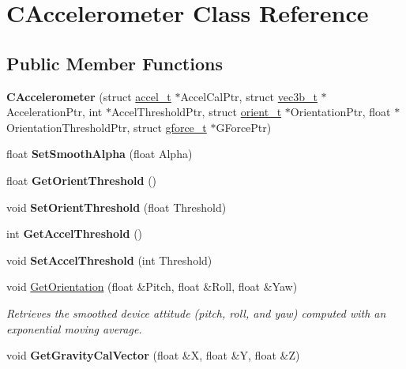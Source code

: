 \hypertarget{class_c_accelerometer}{\section{C\-Accelerometer Class Reference}
\label{class_c_accelerometer}
}
\subsection*{Public Member Functions}
\begin{DoxyCompactItemize}
\item 
\hypertarget{class_c_accelerometer_ac6a043c178545a10a47134638ab243df}{{\bfseries C\-Accelerometer} (struct \hyperlink{structaccel__t}{accel\-\_\-t} $\ast$Accel\-Cal\-Ptr, struct \hyperlink{structvec3b__t}{vec3b\-\_\-t} $\ast$Acceleration\-Ptr, int $\ast$Accel\-Threshold\-Ptr, struct \hyperlink{structorient__t}{orient\-\_\-t} $\ast$Orientation\-Ptr, float $\ast$Orientation\-Threshold\-Ptr, struct \hyperlink{structgforce__t}{gforce\-\_\-t} $\ast$G\-Force\-Ptr)}\label{class_c_accelerometer_ac6a043c178545a10a47134638ab243df}

\item 
\hypertarget{class_c_accelerometer_a09ce4dcabd897c0231569ebc9f476e6b}{float {\bfseries Set\-Smooth\-Alpha} (float Alpha)}\label{class_c_accelerometer_a09ce4dcabd897c0231569ebc9f476e6b}

\item 
\hypertarget{class_c_accelerometer_a5d4a662244592cf20751711c298781e5}{float {\bfseries Get\-Orient\-Threshold} ()}\label{class_c_accelerometer_a5d4a662244592cf20751711c298781e5}

\item 
\hypertarget{class_c_accelerometer_a4a5f3f55dce8a3a8a049ee38c121e00e}{void {\bfseries Set\-Orient\-Threshold} (float Threshold)}\label{class_c_accelerometer_a4a5f3f55dce8a3a8a049ee38c121e00e}

\item 
\hypertarget{class_c_accelerometer_a51262cabf03ac689875b6cb37f27f253}{int {\bfseries Get\-Accel\-Threshold} ()}\label{class_c_accelerometer_a51262cabf03ac689875b6cb37f27f253}

\item 
\hypertarget{class_c_accelerometer_a8e2e5501d5d151558206eb61f0e24b99}{void {\bfseries Set\-Accel\-Threshold} (int Threshold)}\label{class_c_accelerometer_a8e2e5501d5d151558206eb61f0e24b99}

\item 
void \hyperlink{class_c_accelerometer_ae332fb3f201d67f554328fadaa343fe0}{Get\-Orientation} (float \&Pitch, float \&Roll, float \&Yaw)
\begin{DoxyCompactList}\small\item\em Retrieves the smoothed device attitude (pitch, roll, and yaw) computed with an exponential moving average. \end{DoxyCompactList}\item 
\hypertarget{class_c_accelerometer_a8813b02e69b3072f4190b9779954b79d}{void {\bfseries Get\-Gravity\-Cal\-Vector} (float \&X, float \&Y, float \&Z)}\label{class_c_accelerometer_a8813b02e69b3072f4190b9779954b79d}


\end{DoxyCompactItemize}
